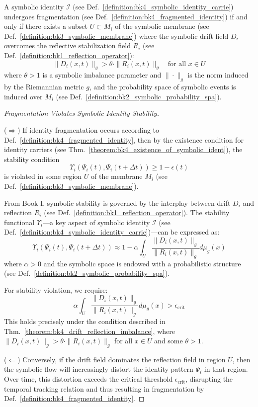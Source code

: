 \begin{theorem} \label{theorem:bk4_drift_reflection_imbalance}
A symbolic identity $\mathcal{I}$ (see Def.~\ref{definition:bk4_symbolic_identity_carrie}) undergoes fragmentation (see Def.~\ref{definition:bk4_fragmented_identity}) if and only if there exists a subset $U \subset M_i$ of the symbolic membrane (see Def.~\ref{definition:bk3_symbolic_membrane}) where the symbolic drift field $D_i$ overcomes the reflective stabilization field $R_i$ (see Def.~\ref{definition:bk1_reflection_operator}):
\begin{equation}
    \|D_i(x,t)\|_g > \theta \cdot \|R_i(x,t)\|_g \quad \text{for all } x \in U
\end{equation}
where $\theta > 1$ is a symbolic imbalance parameter and $\|\cdot\|_g$ is the norm induced by the Riemannian metric $g$, and the probability space of symbolic events is induced over $M_i$ (see Def.~\ref{definition:bk2_symbolic_probability_spa}).
\end{theorem}
\begin{proof}[Fragmentation Violates Symbolic Identity Stability]
\label{proof:bk4_fragmentation_identity_stability}
\leavevmode

($\Rightarrow$) If identity fragmentation occurs according to Def.~\ref{definition:bk4_fragmented_identity}, then by the existence condition for identity carriers (see Thm.~\ref{theorem:bk4_existence_of_symbolic_ident}), the stability condition 
\[
\Upsilon_i(\Psi_i(t), \Psi_i(t+\Delta t)) \geq 1 - \epsilon(t)
\]
is violated in some region $U$ of the membrane $M_i$ (see Def.~\ref{definition:bk3_symbolic_membrane}).

From Book I, symbolic stability is governed by the interplay between drift $D_i$ and reflection $R_i$ (see Def.~\ref{definition:bk1_reflection_operator}). The stability functional $\Upsilon_i$---a key aspect of symbolic identity $\mathcal{I}$ (see Def.~\ref{definition:bk4_symbolic_identity_carrie})---can be expressed as:
\[
\Upsilon_i(\Psi_i(t), \Psi_i(t+\Delta t)) \approx 1 - \alpha \int_U \frac{\|D_i(x,t)\|_g}{\|R_i(x,t)\|_g} d\mu_g(x)
\]
where $\alpha > 0$ and the symbolic space is endowed with a probabilistic structure (see Def.~\ref{definition:bk2_symbolic_probability_spa}).

For stability violation, we require:
\[
\alpha \int_U \frac{\|D_i(x,t)\|_g}{\|R_i(x,t)\|_g} d\mu_g(x) > \epsilon_{\text{crit}}
\]
This holds precisely under the condition described in Thm.~\ref{theorem:bk4_drift_reflection_imbalance}, where $\|D_i(x,t)\|_g > \theta \cdot \|R_i(x,t)\|_g$ for all $x \in U$ and some $\theta > 1$.

($\Leftarrow$) Conversely, if the drift field dominates the reflection field in region $U$, then the symbolic flow will increasingly distort the identity pattern $\Psi_i$ in that region. Over time, this distortion exceeds the critical threshold $\epsilon_{\text{crit}}$, disrupting the temporal tracking relation and thus resulting in fragmentation by Def.~\ref{definition:bk4_fragmented_identity}.

\end{proof}
